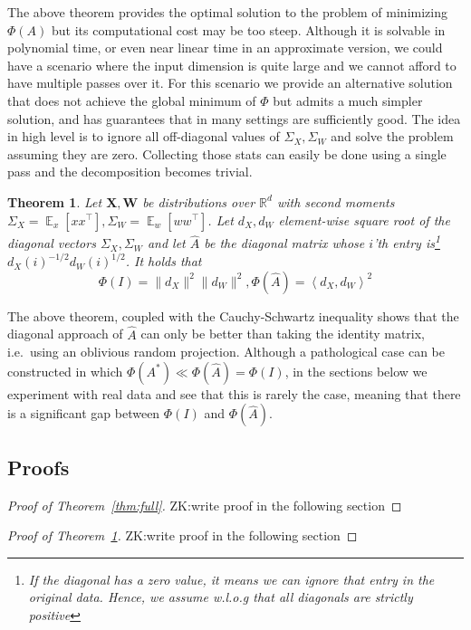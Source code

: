 \documentclass{article}
\newtheorem{theorem}{Theorem}[section]
\theoremstyle{definition}
\theoremstyle{plain}
\newcommand{\R}{\mathbb{R}}
\newcommand{\X}{\mathbf{X}}
\newcommand{\W}{\mathbf{W}}
\DeclareMathOperator{\E}{\mathbb{E}}
\newcommand{\ip}[1]{\left \langle #1 \right \rangle}
\newcommand{\zk}[1]{{\color{blue}ZK:#1}}
\begin{document}
The above theorem provides the optimal solution to the problem of minimizing $\Phi(A)$ but its computational cost may be too steep. Although it is solvable in polynomial time, or even near linear time in an approximate version, we could have a scenario where the input dimension is quite large and we cannot afford to have multiple passes over it. For this scenario we provide an alternative solution that does not achieve the global minimum of $\Phi$ but admits a much simpler solution, and has guarantees that in many settings are sufficiently good. The idea in high level is to ignore all off-diagonal values of $\Sigma_X, \Sigma_W$ and solve the problem assuming they are zero. Collecting those stats can easily be done using a single pass and the decomposition becomes trivial.

\begin{theorem} \label{thm:fast}
Let $\X,\W$ be distributions over $\R^d$ with second moments $\Sigma_X=\E_x[xx^\top], \Sigma_W=\E_w[ww^\top]$. Let $d_X,  d_W$ element-wise square root of the diagonal vectors $\Sigma_X, \Sigma_W$ and let $\hat{A}$ be the diagonal matrix whose $i$'th entry is\footnote{If the diagonal has a zero value, it means we can ignore that entry in the original data. Hence, we assume w.l.o.g that all diagonals are strictly positive} $d_X(i)^{-1/2} d_W(i)^{1/2}$. It holds that
$$ \Phi(I) = \|d_X\|^2 \|d_W\|^2, \Phi(\hat{A}) = \ip{d_X, d_W}^2 $$
\end{theorem}

The above theorem, coupled with the Cauchy-Schwartz inequality shows that the diagonal approach of $\hat{A}$ can only be better than taking the identity matrix, i.e.\ using an oblivious random projection. Although a pathological case can be constructed in which $\Phi(A^*) \ll \Phi(\hat{A}) = \Phi(I)$, in the sections below we experiment with real data and see that this is rarely the case, meaning that there is a significant gap between $\Phi(I)$ and $\Phi(\hat{A})$.

\subsection{Proofs}

\begin{proof} [Proof of Theorem~\ref{thm:full}]
\zk{write proof in the following section}
\end{proof}

\begin{proof} [Proof of Theorem~\ref{thm:fast}]
\zk{write proof in the following section}
\end{proof}
\end{document}
